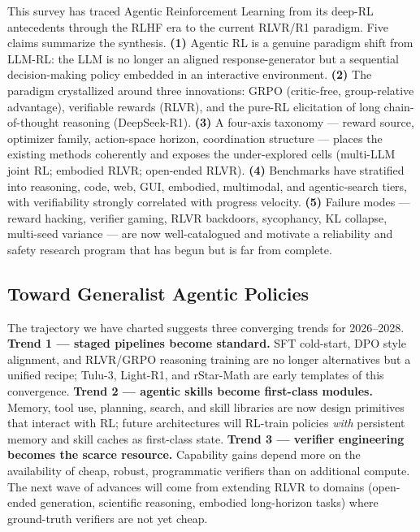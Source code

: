 This survey has traced Agentic Reinforcement Learning from its deep-RL antecedents through the RLHF era to the current RLVR/R1 paradigm. Five claims summarize the synthesis. \textbf{(1)} Agentic RL is a genuine paradigm shift from LLM-RL: the LLM is no longer an aligned response-generator but a sequential decision-making policy embedded in an interactive environment. \textbf{(2)} The paradigm crystallized around three innovations: GRPO (critic-free, group-relative advantage), verifiable rewards (RLVR), and the pure-RL elicitation of long chain-of-thought reasoning (DeepSeek-R1). \textbf{(3)} A four-axis taxonomy --- reward source, optimizer family, action-space horizon, coordination structure --- places the existing methods coherently and exposes the under-explored cells (multi-LLM joint RL; embodied RLVR; open-ended RLVR). \textbf{(4)} Benchmarks have stratified into reasoning, code, web, GUI, embodied, multimodal, and agentic-search tiers, with verifiability strongly correlated with progress velocity. \textbf{(5)} Failure modes --- reward hacking, verifier gaming, RLVR backdoors, sycophancy, KL collapse, multi-seed variance --- are now well-catalogued and motivate a reliability and safety research program that has begun but is far from complete.

\subsection{Toward Generalist Agentic Policies}\label{toward-generalist-agentic-policies}

The trajectory we have charted suggests three converging trends for 2026--2028. \textbf{Trend 1 --- staged pipelines become standard.} SFT cold-start, DPO style alignment, and RLVR/GRPO reasoning training are no longer alternatives but a unified recipe; Tulu-3, Light-R1, and rStar-Math are early templates of this convergence. \textbf{Trend 2 --- agentic skills become first-class modules.} Memory, tool use, planning, search, and skill libraries are now design primitives that interact with RL; future architectures will RL-train policies \emph{with} persistent memory and skill caches as first-class state. \textbf{Trend 3 --- verifier engineering becomes the scarce resource.} Capability gains depend more on the availability of cheap, robust, programmatic verifiers than on additional compute. The next wave of advances will come from extending RLVR to domains (open-ended generation, scientific reasoning, embodied long-horizon tasks) where ground-truth verifiers are not yet cheap.


